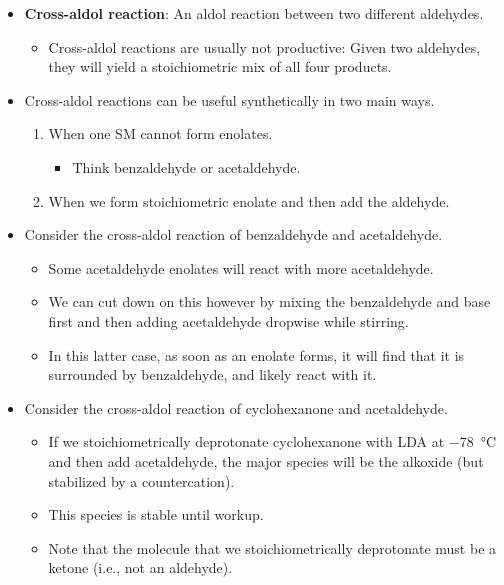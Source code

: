 \documentclass[../notes.tex]{subfiles}
\begin{document}
\begin{itemize}
\begin{itemize}
    \end{itemize}
    \item \textbf{Cross-aldol reaction}: An aldol reaction between two different aldehydes.
    \begin{itemize}
        \item Cross-aldol reactions are usually not productive: Given two aldehydes, they will yield a stoichiometric mix of all four products.
    \end{itemize}
    \item Cross-aldol reactions can be useful synthetically in two main ways.
    \begin{enumerate}
        \item When one SM cannot form enolates.
        \begin{itemize}
            \item Think benzaldehyde or acetaldehyde.
        \end{itemize}
        \item When we form stoichiometric enolate and then add the aldehyde.
    \end{enumerate}
    \item Consider the cross-aldol reaction of benzaldehyde and acetaldehyde.
    \begin{itemize}
        \item Some acetaldehyde enolates will react with more acetaldehyde.
        \item We can cut down on this however by mixing the benzaldehyde and base first and then adding acetaldehyde dropwise while stirring.
        \item In this latter case, as soon as an enolate forms, it will find that it is surrounded by benzaldehyde, and likely react with it.
    \end{itemize}
    \item Consider the cross-aldol reaction of cyclohexanone and acetaldehyde.
    \begin{itemize}
        \item If we stoichiometrically deprotonate cyclohexanone with LDA at \SI{-78}{\celsius} and then add acetaldehyde, the major species will be the alkoxide (but stabilized by a  countercation).
        \item This species is stable until workup.
        \item Note that the molecule that we stoichiometrically deprotonate must be a ketone (i.e., not an aldehyde).
        \begin{itemize}

\end{itemize}
\end{itemize}
\end{itemize}
\end{document}
